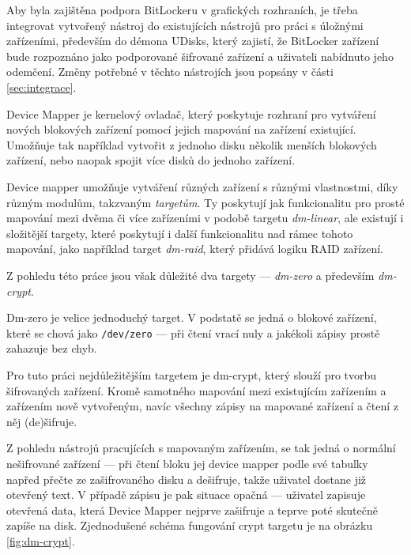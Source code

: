 Aby byla zajištěna podpora BitLockeru v grafických rozhraních, je třeba integrovat vytvořený nástroj do existujících nástrojů pro práci s úložnými zařízeními, především do démona UDisks, který zajistí, že BitLocker zařízení bude rozpoznáno jako podporované šifrované zařízení a uživateli nabídnuto jeho odemčení. Změny potřebné v těchto nástrojích jsou popsány v části \ref{sec:integrace}.

\label{sec:device-mapper}

Device Mapper je kernelový ovladač, který poskytuje rozhraní pro vytváření nových blokových zařízení pomocí jejich mapování na zařízení existující. Umožňuje tak například vytvořit z jednoho disku několik menších blokových zařízení, nebo naopak spojit více disků do jednoho zařízení.\cite{RedHat2019}

Device mapper umožňuje vytváření různých zařízení s různými vlastnostmi, díky různým modulům, takzvaným \emph{targetům}. Ty poskytují jak funkcionalitu pro prosté mapování mezi dvěma či více zařízeními v podobě targetu \emph{dm-linear}, ale existují i složitější targety, které poskytují i další funkcionalitu nad rámec tohoto mapování, jako například target \emph{dm-raid}, který přidává logiku RAID zařízení.

Z pohledu této práce jsou však důležité dva targety --- \emph{dm-zero} a především \emph{dm-crypt}.


Dm-zero je velice jednoduchý target. V podstatě se jedná o blokové zařízení, které se chová jako \texttt{/dev/zero} --- při čtení vrací nuly a jakékoli zápisy prostě zahazuje bez chyb.\cite{KernelZero}


Pro tuto práci nejdůležitějším targetem je dm-crypt, který slouží pro tvorbu šifrovaných zařízení. Kromě samotného mapování mezi existujícím zařízením a zařízením nově vytvořeným, navíc všechny zápisy na mapované zařízení a čtení z něj (de)šifruje.\cite{Broz2018}

Z pohledu nástrojů pracujících s mapovaným zařízením, se tak jedná o normální nešifrované zařízení --- při čtení bloku jej device mapper podle své tabulky napřed přečte ze zašifrovaného disku a dešifruje, takže uživatel dostane již otevřený text. V případě zápisu je pak situace opačná --- uživatel zapisuje otevřená data, která Device Mapper nejprve zašifruje a teprve poté skutečně zapíše na disk. Zjednodušené schéma fungování crypt targetu je na obrázku \ref{fig:dm-crypt}.

